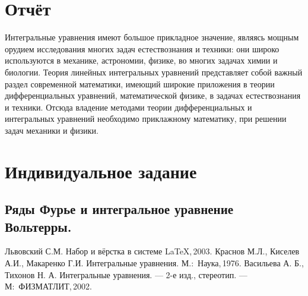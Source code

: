 \documentclass[12pt]{article}
\begin{document}
\newpage
\section{Отчёт}
Интегральные уравнения имеют большое прикладное значение, являясь мощным
орудием исследования многих задач естествознания и техники: они широко используются
в механике, астрономии, физике, во многих задачах химии и биологии. Теория линейных
интегральных уравнений представляет собой важный раздел современной математики,
имеющий широкие приложения в теории дифференциальных уравнений, математической
физике, в задачах естествознания и техники. Отсюда владение методами теории
дифференциальных и интегральных уравнений необходимо приклажному математику, при решении задач
механики и физики.

\newpage
\section{Индивидуальное задание}

\subsection{Ряды Фурье и интегральное уравнение Вольтерры.}




\newpage
{}
\begin{thebibliography}{99}
 Львовский С.М. Набор и вёрстка в системе \LaTeX,\,2003.
 Краснов М.Л., Киселев А.И., Макаренко Г.И. Интегральные уравнения. М.:~Наука,\,1976.
 Васильева А. Б., Тихонов Н. А. Интегральные уравнения. --- 2-е изд., стереотип. --- М:~ФИЗМАТЛИТ,\,2002.
\end{thebibliography}
\end{document}
